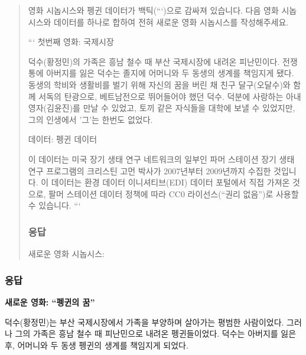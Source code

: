 \documentclass[
  letterpaper,
]{book}
\begin{document}
\begin{tcolorbox}[enhanced jigsaw, opacityback=0, opacitybacktitle=0.6, colback=white, rightrule=.15mm, coltitle=black, colframe=quarto-callout-note-color-frame, colbacktitle=quarto-callout-note-color!10!white, bottomrule=.15mm, bottomtitle=1mm, breakable, title=\textcolor{quarto-callout-note-color}{\faInfo}\hspace{0.5em}{프롬프트}, titlerule=0mm, leftrule=.75mm, toptitle=1mm, left=2mm, arc=.35mm, toprule=.15mm]

\begin{quote}
영화 시놉시스와 펭귄 데이터가 백틱(```)으로 감싸져 있습니다. 다음 영화
시놉시스와 데이터를 하나로 합하여 전혀 새로운 영화 시놉시스를
작성해주세요.

``` 첫번째 영화: 국제시장

덕수(황정민)의 가족은 흥남 철수 때 부산 국제시장에 내려온 피난민이다.
전쟁통에 아버지를 잃은 덕수는 졸지에 어머니와 두 동생의 생계를 책임지게
됐다. 동생의 학비와 생활비를 벌기 위해 자신의 꿈을 버린 채 친구
달구(오달수)와 함께 서독의 탄광으로, 베트남전으로 뛰어들어야 했던 덕수.
덕분에 사랑하는 아내 영자(김윤진)를 만날 수 있었고, 토끼 같은 자식들을
대학에 보낼 수 있었지만, 그의 인생에서 '그'는 한번도 없었다.

데이터: 펭귄 데이터

이 데이터는 미국 장기 생태 연구 네트워크의 일부인 파머 스테이션 장기
생태 연구 프로그램의 크리스틴 고먼 박사가 2007년부터 2009년까지 수집한
것입니다. 이 데이터는 환경 데이터 이니셔티브(EDI) 데이터 포털에서 직접
가져온 것으로, 팔머 스테이션 데이터 정책에 따라 CC0 라이선스(``권리
없음'')로 사용할 수 있습니다. ```

\hypertarget{uxc751uxb2f5}{%
\subsubsection*{응답}\label{uxc751uxb2f5}}

새로운 영화 시놉시스:
\end{quote}

\hypertarget{uxc751uxb2f5-1}{%
\subsubsection*{응답}\label{uxc751uxb2f5-1}}

\textbf{새로운 영화: ``펭귄의 꿈''}

덕수(황정민)는 부산 국제시장에서 가족을 부양하며 살아가는 평범한
사람이었다. 그러나 그의 가족은 흥남 철수 때 피난민으로 내려온
펭귄들이었다. 덕수는 아버지를 잃은 후, 어머니와 두 동생 펭귄의 생계를
책임지게 되었다.


\end{tcolorbox}
\end{document}
